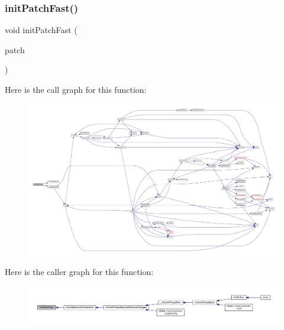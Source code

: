 \subsubsection{\texorpdfstring{init\+Patch\+Fast()}{initPatchFast()}}
{\footnotesize\ttfamily void init\+Patch\+Fast (\begin{DoxyParamCaption}\item[{struct Patch\+Fast $\ast$}]{patch }\end{DoxyParamCaption})}

Here is the call graph for this function\+:
\nopagebreak
\begin{figure}[H]
\begin{center}
\leavevmode
\includegraphics[width=350pt]{patch-fast_8c_af3dd4e6e3ab43135351cc1cd3e9bff90_cgraph}
\end{center}
\end{figure}
Here is the caller graph for this function\+:
\nopagebreak
\begin{figure}[H]
\begin{center}
\leavevmode
\includegraphics[width=350pt]{patch-fast_8c_af3dd4e6e3ab43135351cc1cd3e9bff90_icgraph}
\end{center}
\end{figure}
